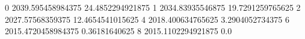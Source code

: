0 2039.595458984375 24.4852294921875
1 2034.83935546875 19.7291259765625
2 2027.57568359375 12.4654541015625
4 2018.400634765625 3.2904052734375
6 2015.4720458984375 0.36181640625
8 2015.1102294921875 0.0
